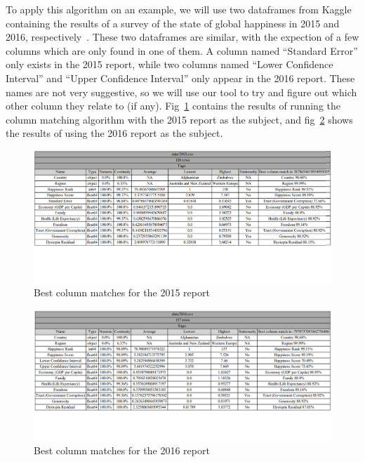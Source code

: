 To apply this algorithm on an example, we will use two dataframes from Kaggle containing the results of a survey of the
state of global happiness in 2015 and 2016, respectively~\cite{kaggleWorldHappinessReport}.
These two dataframes are similar, with the expection of a few columns which are only found in one of them.
A column named ``Standard Error'' only exists in the 2015 report, while two columns named ``Lower Confidence Interval'' and
``Upper Confidence Interval'' only appear in the 2016 report.
These names are not very suggestive, so we will use our tool to try and figure out which other column they relate to (if any).
Fig~\ref{fig:2015_column_match} contains the results of running the column matching algorithm with the 2015 report as the subject,
and fig~\ref{fig:2016_column_match} shows the results of using the 2016 report as the subject.

\begin{figure}[H]
    \centering
    \includegraphics[width=12cm]{figures/best_column_match_id/2015_column_match}
    \caption{Best column matches for the 2015 report}
    \label{fig:2015_column_match}
\end{figure}

\begin{figure}[H]
    \centering
    \includegraphics[width=12cm]{figures/best_column_match_id/2016_column_match}
    \caption{Best column matches for the 2016 report}
    \label{fig:2016_column_match}
\end{figure}

